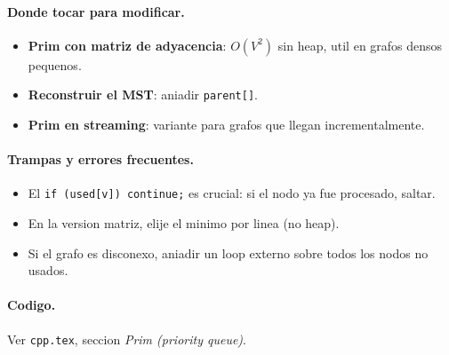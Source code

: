 \paragraph{Donde tocar para modificar.}
\begin{itemize}\setlength\itemsep{0pt}
	\item \textbf{Prim con matriz de adyacencia}: $O(V^2)$ sin heap, util en grafos densos pequenos.
	\item \textbf{Reconstruir el MST}: aniadir \texttt{parent[]}.
	\item \textbf{Prim en streaming}: variante para grafos que llegan incrementalmente.
\end{itemize}

\paragraph{Trampas y errores frecuentes.}
\begin{itemize}\setlength\itemsep{0pt}
	\item El \texttt{if (used[v]) continue;} es crucial: si el nodo ya fue procesado, saltar.
	\item En la version matriz, elije el minimo por linea (no heap).
	\item Si el grafo es disconexo, aniadir un loop externo sobre todos los nodos no usados.
\end{itemize}

\paragraph{Codigo.}
Ver \texttt{cpp.tex}, seccion \textit{Prim (priority queue)}.

